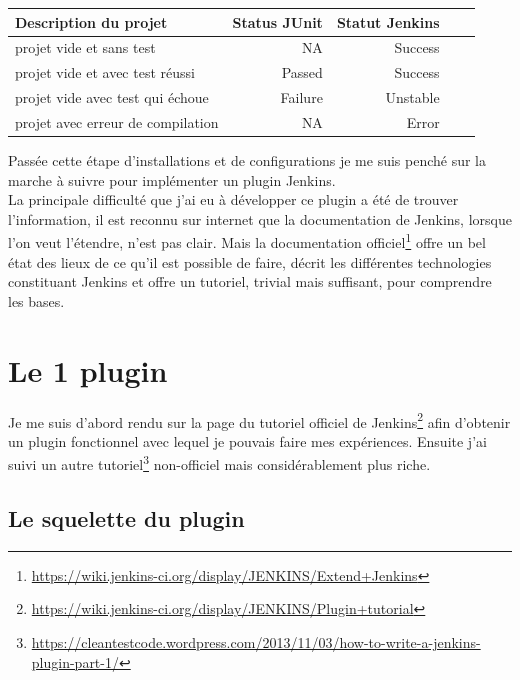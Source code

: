 \begin{tabular}{|l|rr|c|c|}
	\hline
  \textbf{Description du projet} 							& \textbf{Status JUnit} 	& \textbf{Statut Jenkins}\\
  \hline
  projet vide et sans test 						& NA 						& Success\\
	
	projet vide et avec test réussi			& Passed				& Success\\
  
  projet vide avec test qui échoue 		& Failure				& Unstable\\
	
  projet avec erreur de compilation 	& NA						& Error\\
  \hline
\end{tabular}


Passée cette étape d'installations et de configurations je me suis penché sur la marche à suivre pour implémenter un plugin Jenkins.\\
La principale difficulté que j'ai eu à développer ce plugin a été de trouver l'information, il est reconnu sur internet que la documentation de Jenkins, lorsque l'on veut l'étendre, n'est pas clair. Mais la documentation officiel\footnote{\url{https://wiki.jenkins-ci.org/display/JENKINS/Extend+Jenkins}} offre un bel état des lieux de ce qu'il est possible de faire, décrit les différentes technologies constituant Jenkins et offre un tutoriel, trivial mais suffisant, pour comprendre les bases.\\



\section{Le 1 plugin}

Je me suis d'abord rendu sur la page du tutoriel officiel de Jenkins\footnote{\url{https://wiki.jenkins-ci.org/display/JENKINS/Plugin+tutorial}} afin d'obtenir un plugin fonctionnel avec lequel je pouvais faire mes expériences. Ensuite j'ai suivi un autre tutoriel\footnote{\url{https://cleantestcode.wordpress.com/2013/11/03/how-to-write-a-jenkins-plugin-part-1/}} non-officiel mais considérablement plus riche.\\

\subsection{Le squelette du plugin}
